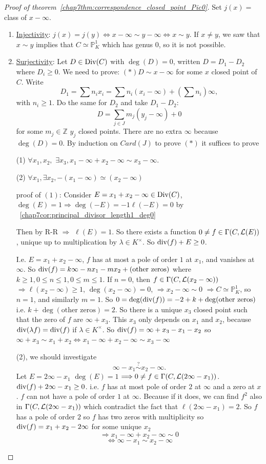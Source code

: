 \documentclass[11pt]{article}
\theoremstyle{definition}
\newcommand{\proj}{\mathbb P}
\newcommand{\intg}{\mathbb Z}
\newcommand{\call}{{\cal L}}
\renewcommand{\div}{\textnormal{div}}
\newcommand{\Div}{\textnormal{Div}}
\newcommand{\Lrta}{\Longrightarrow}
\newcommand{\Llrta}{\Longleftrightarrow}
\begin{document}
\begin{proof}[Proof of theorem~\ref{chap7thm:correspondence_closed_point_Pic0}] Set
$j(x)=$ class of $x-\infty$.
\begin{enumerate}[label=(\arabic*)]
\item \underline{Injectivity}: $j(x)=j(y)\Llrta x-\infty\sim y-\infty\Llrta x\sim y$. If $x\neq y$, we saw that $x\sim y$ implies that $C\simeq \proj^1_K$ which has genus $0$, so it is not possible.
\item \underline{Surjectivity}: Let $D\in \Div(C)$ with $\deg(D)=0$, written $D=D_1-D_2$ where $D_i\geq 0$. We need to prove: $(*)D\sim x-\infty$ for some $x$ closed point of $C$. Write 
$$
D_1=\sum n_i x_i=\sum n_i(x_i-\infty)+(\sum n_i)\infty,
$$
with $n_i\geq 1$.
Do  the same for $D_2$ and take $D_1-D_2:$
$$
D=\sum_{j\in J} m_j(y_j-\infty)+0
$$
for some $m_j\in \intg$ $y_j$ closed points. There are no extra $\infty$ because $\deg(D)=0$. By induction on $Card(J)$ to prove $(*)$ it suffices to prove

(1) $\forall x_1,x_2,$ $\exists x_3, x_1-\infty+x_2-\infty\sim x_3-\infty$.

(2) $\forall x_1,\exists x_2, -(x_1-\infty)\simeq (x_2-\infty)$

proof of $(1)$: Consider $E=x_1+x_2-\infty\in \Div(C)$, $\deg(E)=1\Lrta \deg (-E)=-1 \ell(-E)=0$ by ~\ref{chap7cor:principal_divisor_length1_deg0}

Then by R-R $\Lrta$ $\ell(E)=1$. So there exists a function $0\neq f \in \Gamma(C,\call(E))$
, unique up to multiplication by $\lambda\in K^\times$. So $\div(f)+ E\geq 0$.

I.e. $E=x_1+x_2-\infty$, $f$ has at most a pole of order $1$ at $x_1$,  and vanishes at $\infty$. So $\div(f)=k\infty -n x_1-m x_2+(\text{other zeros})$ where $k\geq 1, 0\leq n\leq 1, 0\leq m\leq 1$. If $n=0$, then $f\in \Gamma(C,\call(x_2-\infty))$  
$\Lrta \ell(x_2-\infty)\geq 1$,
 $\deg(x_2-\infty)=0$, $\Lrta x_2-\infty\sim 0$ $\Lrta C\simeq \proj^1_K$, so $n=1$, and similarly $m=1$. So $0=\deg(\div(f))=-2+k+\deg(\text{other zeros})$ i.e. $k+\deg(\text{other zeros})=2$. So there is a unique $x_3$ closed point such that the zero of $f$ are $\infty +x_3$. This $x_3$ only depends on $x_1$ and  $x_2$, because $\div(\lambda f)= \div(f)$ if $\lambda \in K^\times$. So 
 $\div(f)=\infty+x_3-x_1-x_2$ so $\infty +x_3\sim x_1+x_2\Llrta x_1-\infty +x_2-\infty\sim x_3-\infty$

 (2),  we should investigate 
 $$
\infty -x_1\overset{?}{\sim} x_2-\infty.
 $$
 Let $E=2\infty -x_1$ $\deg(E)=1$ $\Lrta 0\neq f \in \Gamma(C,\call(2\infty-x_1))$. $\div(f)+2\infty -x_1\geq 0$. i.e. $f$ has at most pole of order $2$ at $\infty$ and a zero at $x$. {\color{red} $f$ can not have a pole of order $1$ at $\infty$. Because if it does, we can find $f^2$ also in $\Gamma(C,\call(2\infty-x_1))$ which contradict the fact that $\ell(2\infty-x_1)=2$.}  So $f$ has a pole of order $2$ so $f$ has two zeros with multiplicity so $\div(f)=x_1+x_2-2\infty$ for some unique $x_2$
 $$
\Lrta x_1-\infty +x_2-\infty\sim 0
 $$
 $$
\Llrta \infty -x_1\sim x_2-\infty
 $$
\end{enumerate}
\end{proof}
\end{document}
